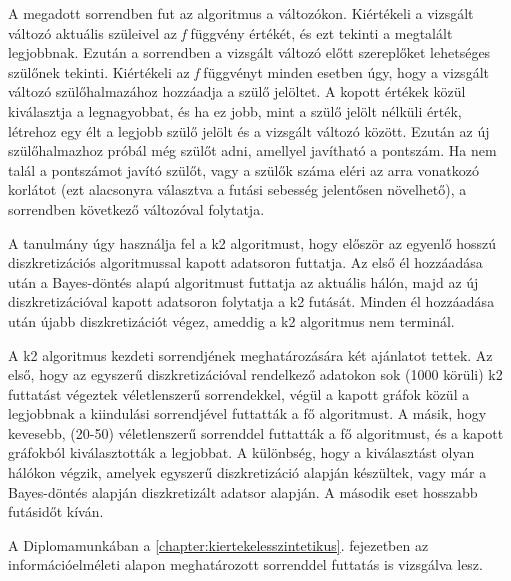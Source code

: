 A megadott sorrendben fut az algoritmus a változókon. Kiértékeli a vizsgált változó aktuális szüleivel az \emph{f} függvény értékét, és ezt tekinti a megtalált legjobbnak. Ezután a sorrendben a vizsgált változó előtt szereplőket lehetséges szülőnek tekinti. Kiértékeli az \emph{f} függvényt minden esetben úgy, hogy a vizsgált változó szülőhalmazához hozzáadja a szülő jelöltet. A kopott értékek közül kiválasztja a legnagyobbat, és ha ez jobb, mint a szülő jelölt nélküli érték, létrehoz egy élt a legjobb szülő jelölt és a vizsgált változó között. Ezután az új szülőhalmazhoz próbál még szülőt adni, amellyel javítható a pontszám. Ha nem talál a pontszámot javító szülőt, vagy a szülők száma eléri az arra vonatkozó korlátot (ezt alacsonyra választva a futási sebesség jelentősen növelhető), a sorrendben következő változóval folytatja.

A tanulmány úgy használja fel a k2 algoritmust, hogy először az egyenlő hosszú diszkretizációs algoritmussal kapott adatsoron futtatja. Az első él hozzáadása után a Bayes-döntés alapú algoritmust futtatja az aktuális hálón, majd az új diszkretizációval kapott adatsoron folytatja a k2 futását. Minden él hozzáadása után újabb diszkretizációt végez, ameddig a k2 algoritmus nem terminál.

A k2 algoritmus kezdeti sorrendjének meghatározására két ajánlatot tettek. Az első, hogy az egyszerű diszkretizációval rendelkező adatokon sok (1000 körüli) k2 futtatást végeztek véletlenszerű sorrendekkel, végül a kapott gráfok közül a legjobbnak a kiindulási sorrendjével futtatták a fő algoritmust. A másik, hogy kevesebb, (20-50) véletlenszerű sorrenddel futtatták a fő algoritmust, és a kapott gráfokból kiválasztották a legjobbat. A különbség, hogy a kiválasztást olyan hálókon végzik, amelyek egyszerű diszkretizáció alapján készültek, vagy már a Bayes-döntés alapján diszkretizált adatsor alapján. A második eset hosszabb futásidőt kíván.

A Diplomamunkában a \ref{chapter:kiertekelesszintetikus}. fejezetben az információelméleti alapon meghatározott sorrenddel futtatás is vizsgálva lesz.